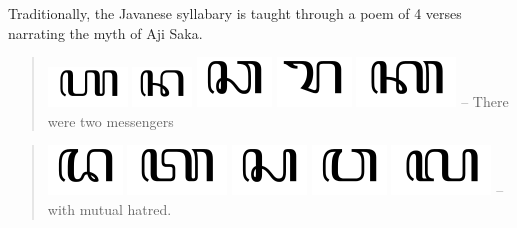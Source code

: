 \documentclass[a4paper,12pt]{book}
\begin{document}
Traditionally, the Javanese syllabary
is taught through a poem of 4 verses
narrating the myth of Aji Saka.
\begin{quote}
  \includegraphics[scale=0.3]{figs/ha.png}
  \includegraphics[scale=0.3]{figs/na.png}
  \includegraphics[scale=0.3]{figs/ca.png}
  \includegraphics[scale=0.3]{figs/ra.png}
  \includegraphics[scale=0.3]{figs/ka.png} --
  There were two messengers
\end{quote}
\begin{quote}
  \includegraphics[scale=0.3]{figs/da.png}
  \includegraphics[scale=0.3]{figs/ta.png}
  \includegraphics[scale=0.3]{figs/sa.png}
  \includegraphics[scale=0.3]{figs/wa.png}
  \includegraphics[scale=0.3]{figs/la.png} --
  with mutual hatred.
\end{quote}
\end{document}
